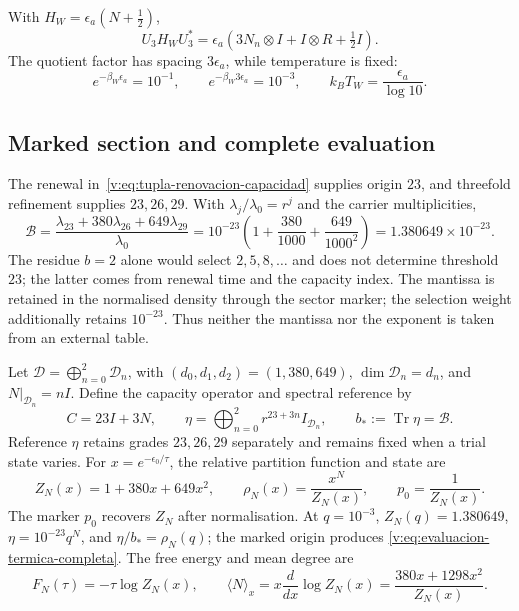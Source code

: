 With $H_W=\epsilon_a(N+\tfrac12)$,
\begin{equation}
 U_3H_WU_3^*
 =\epsilon_a\left(3N_n\otimes I+I\otimes R+\tfrac12I\right).
 \label{v:eq:hamiltoniano-agrupado-decimal}
\end{equation}
The quotient factor has spacing $3\epsilon_a$, while temperature is fixed:
\[
 e^{-\beta_W\epsilon_a}=10^{-1},\qquad
 e^{-\beta_W3\epsilon_a}=10^{-3},\qquad
 k_BT_W=\frac{\epsilon_a}{\log10}.
\]

\subsection{Marked section and complete evaluation}

The renewal in~\eqref{v:eq:tupla-renovacion-capacidad} supplies origin $23$,
and threefold refinement supplies $23,26,29$. With
$\lambda_j/\lambda_0=r^j$ and the carrier multiplicities,
\begin{equation}
 \boxed{
 \mathcal B
 =\frac{\lambda_{23}+380\lambda_{26}+649\lambda_{29}}{\lambda_0}
 =10^{-23}\left(1+\frac{380}{1000}+
                    \frac{649}{1000^2}\right)
 =1.380649\times10^{-23}.}
 \label{v:eq:evaluacion-termica-completa}
\end{equation}
The residue $b=2$ alone would select $2,5,8,\ldots$ and does not determine
threshold $23$; the latter comes from renewal time and the capacity index.
The mantissa is retained in the normalised density through the sector marker;
the selection weight additionally retains $10^{-23}$. Thus neither the
mantissa nor the exponent is taken from an external table.

Let
$\mathcal D=\bigoplus_{n=0}^2\mathcal D_n$, with
$(d_0,d_1,d_2)=(1,380,649)$,
$\dim\mathcal D_n=d_n$, and $N|_{\mathcal D_n}=nI$. Define the capacity
operator and spectral reference by
\begin{equation}
 C=23I+3N,\qquad
 \eta=\bigoplus_{n=0}^2r^{23+3n}I_{\mathcal D_n},\qquad
 b_*:=\operatorname{Tr}\eta=\mathcal B.
 \label{v:eq:referencia-termica-eta}
\end{equation}
Reference $\eta$ retains grades $23,26,29$ separately and remains fixed
when a trial state varies. For $x=e^{-\epsilon_0/\tau}$, the relative
partition function and state are
\begin{equation}
 Z_N(x)=1+380x+649x^2,\qquad
 \rho_N(x)=\frac{x^N}{Z_N(x)},\qquad
 p_0=\frac1{Z_N(x)}.
 \label{v:eq:particion-portador-termico}
\end{equation}
The marker $p_0$ recovers $Z_N$ after normalisation. At $q=10^{-3}$,
$Z_N(q)=1.380649$, $\eta=10^{-23}q^N$, and
$\eta/b_*=\rho_N(q)$; the marked origin produces
\eqref{v:eq:evaluacion-termica-completa}. The free energy and mean degree are
\begin{equation}
 F_N(\tau)=-\tau\log Z_N(x),\qquad
 \langle N\rangle_x=x\frac{d}{dx}\log Z_N(x)
 =\frac{380x+1298x^2}{Z_N(x)}.
 \label{v:eq:energia-libre-grado-medio}
\end{equation}

